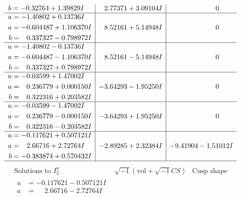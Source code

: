 \documentclass[1p]{elsarticle_modified}
\theoremstyle{definition}
\newcommand{\I}{\sqrt{-1}}
\begin{document}
$$\begin{array}{c|c|c}
\begin{aligned}
b &= -0.32764 + 1.39829 I\end{aligned}
 & \phantom{-}2.77371 + 3.09104 I & \phantom{-0.000000 } 0 \\ \hline\begin{aligned}
u &= -1.40802 + 0.13736 I \\
a &= -0.604487 + 1.106370 I \\
b &= \phantom{-}0.337327 - 0.798972 I\end{aligned}
 & \phantom{-}8.52161 + 5.14948 I & \phantom{-0.000000 } 0 \\ \hline\begin{aligned}
u &= -1.40802 - 0.13736 I \\
a &= -0.604487 - 1.106370 I \\
b &= \phantom{-}0.337327 + 0.798972 I\end{aligned}
 & \phantom{-}8.52161 - 5.14948 I & \phantom{-0.000000 } 0 \\ \hline\begin{aligned}
u &= -0.03599 + 1.47002 I \\
a &= \phantom{-}0.236779 + 0.000150 I \\
b &= \phantom{-}0.322316 + 0.203582 I\end{aligned}
 & -3.64293 - 1.95250 I & \phantom{-0.000000 } 0 \\ \hline\begin{aligned}
u &= -0.03599 - 1.47002 I \\
a &= \phantom{-}0.236779 - 0.000150 I \\
b &= \phantom{-}0.322316 - 0.203582 I\end{aligned}
 & -3.64293 + 1.95250 I & \phantom{-0.000000 } 0 \\ \hline\begin{aligned}
u &= -0.117621 + 0.507121 I \\
a &= \phantom{-}2.66716 + 2.72764 I \\
b &= -0.383874 + 0.570432 I\end{aligned}
 & -2.89285 + 2.32384 I & -9.41904 - 1.51012 I\\
 \hline 
 \end{array}$$\newpage$$\begin{array}{c|c|c}  
\text{Solutions to }I^u_{2}& \I (\text{vol} + \sqrt{-1}CS) & \text{Cusp shape}\\
 \hline 
\begin{aligned}
u &= -0.117621 - 0.507121 I \\
a &= \phantom{-}2.66716 - 2.72764 I \\

\end{aligned}
\end{array}$$
\end{document}

